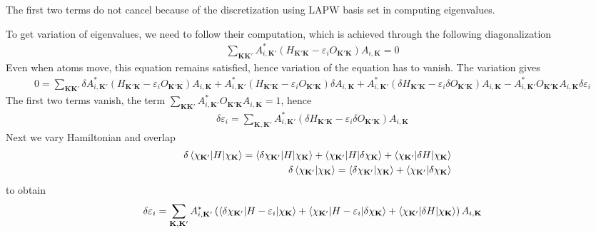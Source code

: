 \documentclass[aps,prb,floatfix,epsfig,singlecolumn,showpacs,preprintnumbers]{revtex4}
\newcommand{\vK}{{\mathbf{K}}}
\begin{document}
The first two terms do not cancel because of the discretization using
LAPW basis set in computing eigenvalues.

To get variation of eigenvalues, we need to follow their computation,
which is achieved through the following diagonalization
\begin{eqnarray}
\sum_{\vK\vK'} A_{i,\vK'}^* (H_{\vK'\vK}-\varepsilon_i O_{\vK'\vK})A_{i,\vK}=0
\label{Eq:eigval}
\end{eqnarray}
Even when atoms move, this equation remains satisfied, hence variation
of the equation has to vanish.
The variation gives
\begin{eqnarray}
0=\sum_{\vK\vK'} \delta A_{i,\vK'}^* (H_{\vK'\vK}-\varepsilon_i O_{\vK'\vK})A_{i,\vK}+
 A_{i,\vK'}^* (H_{\vK'\vK}-\varepsilon_i O_{\vK'\vK})\delta A_{i,\vK}+
 A_{i,\vK'}^* (\delta H_{\vK'\vK}-\varepsilon_i \delta O_{\vK'\vK})A_{i,\vK}-
 A_{i,\vK'}^* O_{\vK'\vK}A_{i,\vK} \delta\varepsilon_i
\nonumber
\end{eqnarray}
The first two terms vanish, the term $\sum_{\vK\vK'}A_{i,\vK'}^*
O_{\vK'\vK}A_{i,\vK} =1$, hence
\begin{eqnarray}
\delta \varepsilon_i=\sum_{\vK,\vK'} A_{i,\vK'}^* (\delta H_{\vK'\vK}-\varepsilon_i \delta O_{\vK'\vK})A_{i,\vK}
\label{Eq:EVA}
\end{eqnarray}
Next we vary Hamiltonian and overlap
\begin{eqnarray}
&& \delta\braket{\chi_{\vK'}|H|\chi_{\vK}}=\braket{\delta  \chi_{\vK'}|H|\chi_{\vK}}+\braket{\chi_{\vK'}|H|\delta\chi_{\vK}}+\braket{\chi_{\vK'}|\delta  H|\chi_{\vK}}\\
&& \delta\braket{\chi_{\vK'}|\chi_{\vK}}=\braket{\delta \chi_{\vK'}|\chi_{\vK}}+\braket{\chi_{\vK'}|\delta\chi_{\vK}}
\end{eqnarray}
to obtain
\begin{eqnarray}
\delta \varepsilon_i=\sum_{\vK,\vK'} A_{i,\vK'}^* 
\left(
\braket{\delta  \chi_{\vK'}|H-\varepsilon_i|\chi_{\vK}}+\braket{\chi_{\vK'}|H-\varepsilon_i|\delta\chi_{\vK}}+\braket{\chi_{\vK'}|\delta  H|\chi_{\vK}}
\right)A_{i,\vK}
\label{Eq:deltae}
\end{eqnarray}
\end{document}
